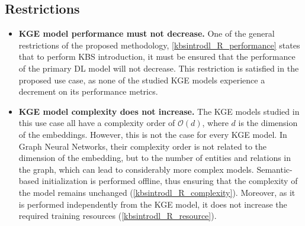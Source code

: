 \subsection{Restrictions}
\begin{itemize}
    \item \textbf{KGE model performance must not decrease.} One of the general restrictions of the proposed methodology, \ref{kbsintrodl_R_performance} states that to perform KBS introduction, it must be ensured that the performance of the primary DL model will not decrease. This restriction is satisfied in the proposed use case, as none of the studied KGE models experience a decrement on its performance metrics. 
    
    \item \textbf{KGE model complexity does not increase.} The KGE models studied in this use case all have a complexity order of $\mathcal{O}(d)$, where $d$ is the dimension of the embeddings. However, this is  not the case for every KGE model. In Graph Neural Networks, their complexity order is not related to the dimension of the embedding, but to the number of entities and relations in the graph, which can lead to considerably more complex models. Semantic-based initialization is performed offline, thus ensuring that the complexity of the model remains unchanged (\ref{kbsintrodl_R_complexity}). Moreover, as it is performed independently from the KGE model, it does not increase the required training resources (\ref{kbsintrodl_R_resource}).
\end{itemize}
